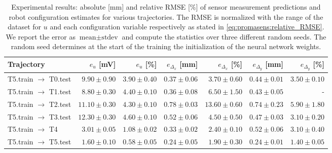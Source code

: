 \begingroup
\setlength{\tabcolsep}{6pt} %
\begin{table}\footnotesize
\centering
\caption{Experimental results: absolute [mm] and relative RMSE [\%] of sensor measurement predictions and robot configuration estimates for various trajectories. The RMSE is normalized with the range of the dataset for $u$ and each configuration variable respectively as stated in \eqref{eq:promasens:relative_RMSE}. We report the error as $\text{mean} \pm \text{stdev}$ and compute the statistics over three different random seeds. The random seed determines at the start of the training the initialization of the neural network weights.}
\begin{tabular}{l rr rrrr}\toprule
\textbf{Trajectory} & $e_{u}$ [mV] & $e_{u}$ [\%] & $e_{\Delta_x}$ [mm] & $e_{\Delta_x}$ [\%] & $e_{\Delta_y}$ [mm] & $e_{\Delta_y}$ [\%]\\
\midrule
T5.train $\rightarrow$ T0.test & $9.90 \pm 0.90$ & $3.90 \pm 0.40$ & $0.37 \pm 0.06$ & $3.70 \pm 0.60$ & $0.44 \pm 0.01$ & $3.50 \pm 0.10$\\ %
T5.train $\rightarrow$ T1.test & $8.80 \pm 0.30$ & $4.40 \pm 0.10$ & $0.36 \pm 0.08$ & $6.50 \pm 1.50$ & $0.43 \pm 0.05$ & -\\ %
T5.train $\rightarrow$ T2.test & $11.10 \pm 0.30$ & $4.30 \pm 0.10$ & $0.78 \pm 0.03$ & $13.60 \pm 0.60$ & $0.74 \pm 0.23$ & $5.90 \pm 1.80$\\ %
T5.train $\rightarrow$ T3.test & $12.30 \pm 0.30$ & $4.60 \pm 0.10$ & $0.52 \pm 0.06$ & $4.50 \pm 0.50$ & $0.47 \pm 0.03$ & $3.10 \pm 0.20$\\ %
T5.train $\rightarrow$ T4 & $3.01 \pm 0.05$ & $1.08 \pm 0.02$ & $0.33 \pm 0.02$ & $2.40 \pm 0.10$ & $0.52 \pm 0.06$ & $3.10 \pm 0.40$\\ %
T5.train $\rightarrow$ T5.test & $1.60 \pm 0.10$ & $0.58 \pm 0.05$ & $0.24 \pm 0.05$ & $1.90 \pm 0.30$ & $0.24 \pm 0.01$ & $1.40 \pm 0.05$\\ %
\bottomrule
\end{tabular}
\label{tab:results_experiments}
\end{table}
\endgroup

